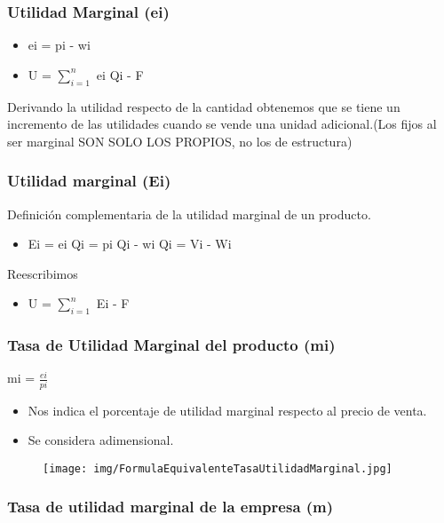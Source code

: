 \documentclass[titlepage,a4paper]{article}
\begin{document}
\subsubsection*{Utilidad Marginal (ei)}
\begin{itemize}
\item ei = pi - wi
\item U = $\sum_{i=1}^n$ ei Qi - F
\end{itemize}


Derivando la utilidad respecto de la cantidad obtenemos que se tiene un incremento de las utilidades cuando se vende una unidad adicional.(Los fijos al ser marginal SON SOLO LOS PROPIOS, no los de estructura)

\subsubsection*{Utilidad marginal (Ei)}
Definición complementaria de la utilidad marginal de un producto.
\begin{itemize}
\item Ei = ei Qi = pi Qi - wi Qi = Vi - Wi
\end{itemize}



Reescribimos
\begin{itemize}
\item U = $\sum_{i=1}^n$ Ei - F
\end{itemize}


\subsubsection*{Tasa de Utilidad Marginal del producto (mi)}

mi = $\frac{ei}{pi}$ %

\begin{itemize}
\item Nos indica el porcentaje de utilidad marginal respecto al precio de venta.
\item Se considera adimensional.
\end{itemize}



\begin{figure}[!htb]
    \centering
    \texttt{[image: img/FormulaEquivalenteTasaUtilidadMarginal.jpg]}
\end{figure}


\subsubsection*{Tasa de utilidad marginal de la empresa (m)}
\end{document}
